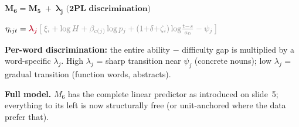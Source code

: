 \documentclass[aspectratio=169,t]{beamer}
\newcommand{\new}[1]{\textcolor{newterm}{\boldsymbol{#1}}}
\newcommand{\old}[1]{\textcolor{black!45}{#1}}
\begin{document}
\begin{frame}[fragile]{$\boldsymbol{M_6 = M_5\;+\;\lambda_j\text{ (2PL discrimination)}}$}

\vspace{0.8em}
\centering
\Large
$\eta_{ijt} = \new{\lambda_j}\,\old{\big[\,\xi_i + \log H + \beta_{c(j)}\log p_j + (1{+}\delta{+}\zeta_i)\log\!\tfrac{t-s}{a_0} - \psi_j\,\big]}$

\vspace{1.4em}
\normalsize
{\color{newterm}\textbf{Per-word discrimination:}} the entire ability
$-$ difficulty gap is multiplied by a word-specific $\lambda_j$. High
$\lambda_j$ = sharp transition near $\psi_j$ (concrete nouns); low
$\lambda_j$ = gradual transition (function words, abstracts).

\vspace{1.6em}
\centering
{}

\vspace{1.4em}
\footnotesize
\textbf{Full model.} $M_6$ has the complete linear predictor as
introduced on slide~5; everything to its left is now structurally
free (or unit-anchored where the data prefer that).

\end{frame}
\end{document}
